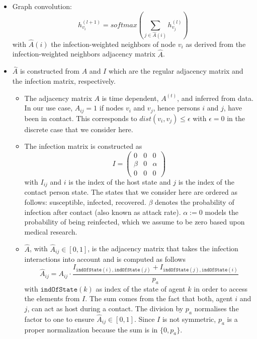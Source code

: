 \documentclass[]{article}
\newcommand{\indexOfState}[1]{\texttt{indOfState}(#1)}
\begin{document}
\begin{itemize}
	\item Graph convolution:
	\begin{equation}
		h_{v_i}^{(l+1)} = softmax(\sum_{j\in \hat{A}(i)} h_{v_j}^{(l)})
	\end{equation}
	with $\hat{A}(i)$ the infection-weighted neighbors of node $v_i$ as derived from the infection-weighted neighbors adjacency matrix $\hat{A}$.
	\item $\hat{A}$ is constructed from $A$ and $I$ which are the regular adjacency matrix and the infection matrix, respectively.
	\begin{itemize}
		\item The adjacency matrix $A$ is time dependent, $A^{(t)}$, and inferred from data. In our use case, $A_{ij}=1$ if nodes $v_i$ and $v_j$, hence persons $i$ and $j$, have been in contact. This corresponds to $dist(v_i, v_j) \le \epsilon$ with $\epsilon=0$ in the discrete case that we consider here.
		\item The infection matrix is constructed as
		\begin{equation}
			I =
			\begin{pmatrix}
				0     &  0  & 0 \\
				\beta &  0  & \alpha \\
				0     &  0  & 0
			\end{pmatrix}
		\end{equation}
		with $I_{ij}$ and $i$ is the index of the host state and $j$ is the index of the contact person state. The states that we consider here are ordered as follows: susceptible, infected, recovered. $\beta$ denotes the probability of infection  after contact (also known as attack rate). $\alpha := 0$ models the probability of being reinfected, which we assume to be zero based upon medical research.
		\item $\hat{A}$, with $\hat{A}_{ij}\in [0, 1]$, is the adjacency matrix that takes the infection interactions into account and is computed as follows
		\begin{equation}
			\hat{A}_{ij} = A_{ij}\cdot \frac{I_{\indexOfState{i}, \indexOfState{j}} + I_{\indexOfState{j}, \indexOfState{i}}}{p_a}
		\end{equation}
		with $\indexOfState{k}$ as index of the state of agent $k$ in order to access the elements from $I$. The sum comes from the fact that both, agent $i$ and $j$, can act as host during a contact. The division by $p_a$ normalises the factor to one to ensure $\hat{A}_{ij} \in [0, 1]$. Since $I$ is not symmetric, $p_a$ is a proper normalization because the sum is in $\{0, p_a\}$.

\end{itemize}
\end{itemize}
\end{document}
